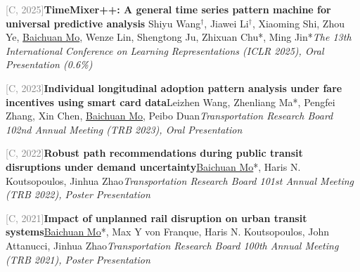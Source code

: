 \par\noindent\begin{minipage}{\linewidth}
{\textcolor{gray}{[C\themyCounterNew, 2025]\;}}{\textbf{TimeMixer++: A general time series pattern machine for universal predictive analysis} \href{https://openreview.net/forum?id=1CLzLXSFNn}{\textcolor{cadmiumorange}{\faExternalLink}}}{\newline Shiyu Wang$^\dagger$, Jiawei Li$^\dagger$, Xiaoming Shi, Zhou Ye, \underline{Baichuan Mo}, Wenze Lin, Shengtong Ju, Zhixuan Chu*, Ming Jin*}{\newline \emph{The 13th International Conference on Learning Representations (ICLR 2025), Oral Presentation (0.6\%)}}{{}}{}
\end{minipage}\par\vspace{5.5pt}


\par\noindent\begin{minipage}{\linewidth}
{\textcolor{gray}{[C\themyCounterNew, 2023]\;}}{\textbf{Individual longitudinal adoption pattern analysis under fare incentives using smart card data}}{\newline Leizhen Wang, Zhenliang Ma*, Pengfei Zhang, Xin Chen, \underline{Baichuan Mo}, Peibo Duan}{\newline \emph{Transportation Research Board 102nd Annual Meeting (TRB 2023), Oral Presentation}}{{}}{}
\end{minipage}\par\vspace{5.5pt}


\par\noindent\begin{minipage}{\linewidth}
{\textcolor{gray}{[C\themyCounterNew, 2022]\;}}{\textbf{Robust path recommendations during public transit disruptions under demand uncertainty}}{\newline \underline{Baichuan Mo}*, Haris N. Koutsopoulos, Jinhua Zhao}{\newline \emph{Transportation Research Board 101st Annual Meeting (TRB 2022), Poster Presentation}}{{}}{}
\end{minipage}\par\vspace{5.5pt}


\par\noindent\begin{minipage}{\linewidth}
{\textcolor{gray}{[C\themyCounterNew, 2021]\;}}{\textbf{Impact of unplanned rail disruption on urban transit systems}}{\newline \underline{Baichuan Mo}*, Max Y von Franque, Haris N. Koutsopoulos, John Attanucci, Jinhua Zhao}{\newline \emph{Transportation Research Board 100th Annual Meeting (TRB 2021), Poster Presentation}}{{}}{}
\end{minipage}\par\vspace{5.5pt}


